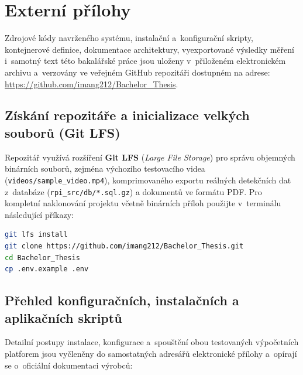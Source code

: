 \chapter{Externí přílohy}
\label{app:external}
Zdrojové kódy navrženého systému, instalační a~konfigurační skripty, kontejnerové definice, dokumentace architektury, vyexportované výsledky měření i~samotný text této bakalářské práce jsou uloženy v~přiloženém elektronickém archivu a~verzovány ve veřejném GitHub repozitáři dostupném na adrese: \url{https://github.com/imang212/Bachelor_Thesis}.

\section*{Získání repozitáře a inicializace velkých souborů (Git LFS)}
Repozitář využívá rozšíření \textbf{Git LFS} (\textit{Large File Storage}) pro správu objemných binárních souborů, zejména výchozího testovacího videa (\texttt{videos/sample\_video.mp4}), komprimovaného exportu reálných detekčních dat z~databáze (\texttt{rpi\_src/db/*.sql.gz}) a dokumentů ve formátu PDF. Pro kompletní naklonování projektu včetně binárních příloh použijte v~terminálu následující příkazy:

\begin{lstlisting}[language=bash, caption={Naklonování veřejného repozitáře projektu a inicializace konfigurace.}, label={lst:git_clone}]
git lfs install
git clone https://github.com/imang212/Bachelor_Thesis.git
cd Bachelor_Thesis
cp .env.example .env
\end{lstlisting}

\section*{Přehled konfiguračních, instalačních a aplikačních skriptů}
Detailní postupy instalace, konfigurace a~spouštění obou testovaných výpočetních platforem jsou vyčleněny do samostatných adresářů elektronické přílohy a~opírají se o~oficiální dokumentaci výrobců:


